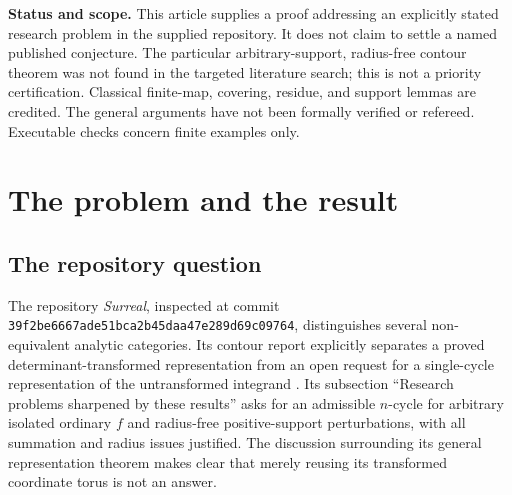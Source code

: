 \documentclass[11pt,letterpaper]{article}
\theoremstyle{definition}
\theoremstyle{remark}
\numberwithin{equation}{section}
\begin{document}
\begin{titlepage}
\begin{minipage}{0.94\textwidth}
\begin{abstract}
A second theorem constructs an exact equation-adapted lift satisfying
$F_j(\Phi)=t^{m_j\rho}p_j$. It is connected to the protecting cycle by a
pole-free Hahn homotopy. This yields a direct Jacobian-residue normalization,
a finite-cover trace formula, and a separately proved extension to formal
coefficient germs. A mixed six-sheeted singularity and exact symbolic checks
illustrate the construction. The proofs use neither fine-topological limits nor
an Archimedean assumption on the value group.
\end{abstract}
\end{minipage}
\vfill
\begin{minipage}{0.94\textwidth}\small
\textbf{Status and scope.} This article supplies a proof addressing an explicitly
stated research problem in the supplied repository. It does not claim to settle
a named published conjecture. The particular arbitrary-support, radius-free
contour theorem was not found in the targeted literature search; this is not a
priority certification. Classical finite-map, covering, residue, and support
lemmas are credited. The general arguments have not been formally verified or
refereed. Executable checks concern finite examples only.
\end{minipage}
\end{titlepage}
\setcounter{page}{2}
\begingroup\footnotesize\setlength{\parskip}{0pt}\tableofcontents\endgroup
\clearpage{}\hypersetup{pageanchor=true}

\section{The problem and the result}
\label{sec:intro}

\subsection{The repository question}
The repository \emph{Surreal}, inspected at commit
\texttt{39f2be6667ade51bca2b45daa47e289d69c09764}, distinguishes several
non-equivalent analytic categories. Its contour report explicitly separates a
proved determinant-transformed representation from an open request for a
single-cycle representation of the untransformed integrand
\cite{Repo,RepoContours}. Its subsection ``Research problems sharpened by these
results'' asks for an admissible $n$-cycle for arbitrary isolated ordinary $f$
and radius-free positive-support perturbations, with all summation and radius
issues justified. The discussion surrounding its general representation theorem
makes clear that merely reusing its transformed coordinate torus is not an
answer.
\end{document}
